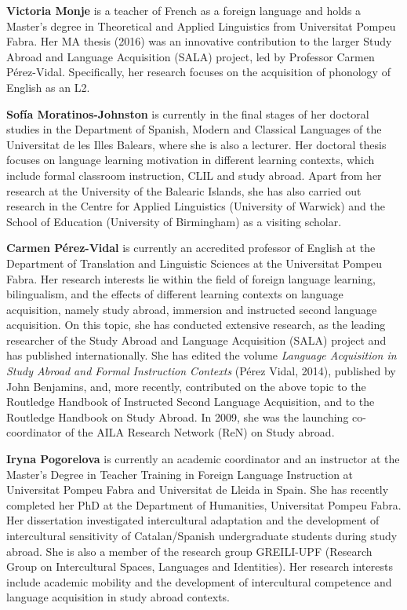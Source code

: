 \textbf{Victoria Monje} is a teacher of French as a {foreign language} and holds a Master’s degree in Theoretical and Applied {Linguistics} from Universitat Pompeu Fabra. Her MA thesis (2016) was an innovative contribution to the larger Study {Abroad} and Language Acquisition (SALA) project, led by Professor Carmen Pé\-rez-Vidal. Specifically, her research focuses on the {acquisition} of {phonology} of {English} as an {L2}.

\textbf{Sofía Moratinos-Johnston} is currently in the final stages of her doctoral studies in the Department of {Spanish}, Modern and Classical Languages of the Universitat de les Illes Balears, where she is also a lecturer. Her doctoral thesis focuses on language {learning motivation} in different learning contexts, which include formal {classroom instruction}, {CLIL} and study abroad. Apart from her research at the University of the Balearic Islands, she has also carried out research in the Centre for Applied {Linguistics} (University of Warwick) and the School of Education (University of Birmingham) as a visiting scholar.

\textbf{Carmen Pérez-Vidal} is currently an accredited professor of {English} at the Department of Translation and Linguistic Sciences at the Universitat Pompeu Fabra. Her research interests lie within the field of {foreign language} learning, bilingualism, and the effects of different learning contexts on language {acquisition}, namely study abroad, {immersion} and instructed second language {acquisition}. On this topic, she has conducted extensive research, as the leading researcher of the Study {Abroad} and Language Acquisition (SALA) project and has published internationally. She has edited the volume \textit{Language Acquisition in Study {Abroad} and Formal Instruction Contexts} (Pérez Vidal, 2014), published by John Benjamins, and, more recently, contributed on the above topic to the Routledge Handbook of Instructed Second Language Acquisition, and to the Routledge Handbook on Study {Abroad}.  In 2009, she was the launching co-coordinator of the AILA Research Network (ReN) on Study abroad.

\textbf{Iryna Pogorelova} is currently an academic coordinator and an instructor at the Master's Degree in Teacher Training in Foreign Language Instruction at Universitat Pompeu Fabra and Universitat de Lleida in Spain. She has recently completed her PhD at the Department of Humanities, Universitat Pompeu Fabra. Her dissertation investigated {intercultural} adaptation and the development of {intercultural} sensitivity of {Catalan}/{Spanish} undergraduate students during study abroad. She is also a member of the research group GREILI-UPF (Research Group on Intercultural Spaces, Languages and Identities). Her research interests include academic mobility and the development of {intercultural} competence and language {acquisition} in study abroad contexts. 
 
